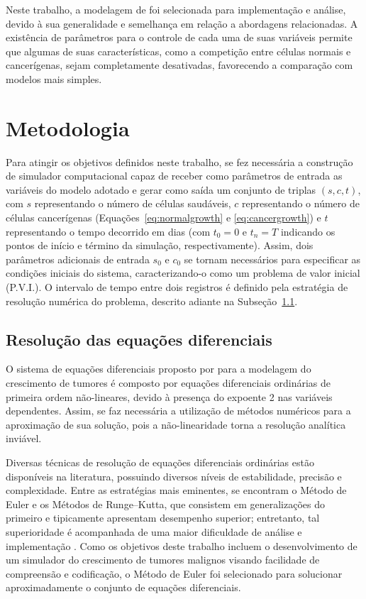 \documentclass[12pt]{article}
\begin{document}

Neste trabalho, a modelagem de \cite{Panetta1996} foi selecionada para implementação e análise, devido à sua generalidade e semelhança em relação a abordagens relacionadas. A existência de parâmetros para o controle de cada uma de suas variáveis permite que algumas de suas características, como a competição entre células normais e cancerígenas, sejam completamente desativadas, favorecendo a comparação com modelos mais simples.

\section{Metodologia} \label{sec:methodology} %

Para atingir os objetivos definidos neste trabalho, se fez necessária a construção de simulador computacional capaz de receber como parâmetros de entrada as variáveis do modelo adotado e gerar como saída um conjunto de triplas $(s, c, t)$, com $s$ representando o número de células saudáveis, $c$ representando o número de células cancerígenas (Equações~\ref{eq:normalgrowth} e \ref{eq:cancergrowth}) e $t$ representando o tempo decorrido em dias (com $t_{0} = 0$ e $t_{n} = T$ indicando os pontos de início e término da simulação, respectivamente). Assim, dois parâmetros adicionais de entrada $s_{0}$ e $c_{0}$ se tornam necessários para especificar as condições iniciais do sistema, caracterizando-o como um problema de valor inicial (P.V.I.). O intervalo de tempo entre dois registros é definido pela estratégia de resolução numérica do problema, descrito adiante na Subseção~\ref{sec:numerical}.

\subsection{Resolução das equações diferenciais} \label{sec:numerical}

O sistema de equações diferenciais proposto por \cite{Panetta1996} para a modelagem do crescimento de tumores é composto por equações diferenciais ordinárias de primeira ordem não-lineares, devido à presença do expoente 2 nas variáveis dependentes. Assim, se faz necessária a utilização de métodos numéricos para a aproximação de sua solução, pois a não-linearidade torna a resolução analítica inviável.

Diversas técnicas de resolução de equações diferenciais ordinárias estão disponíveis na literatura, possuindo diversos níveis de estabilidade, precisão e complexidade. Entre as estratégias mais eminentes, se encontram o Método de Euler e os Métodos de Runge--Kutta, que consistem em generalizações do primeiro e tipicamente apresentam desempenho superior; entretanto, tal superioridade é acompanhada de uma maior dificuldade de análise e implementação \cite{Butcher2016}. Como os objetivos deste trabalho incluem o desenvolvimento de um simulador do crescimento de tumores malignos visando facilidade de compreensão e codificação, o Método de Euler foi selecionado para solucionar aproximadamente o conjunto de equações diferenciais.
\end{document}
